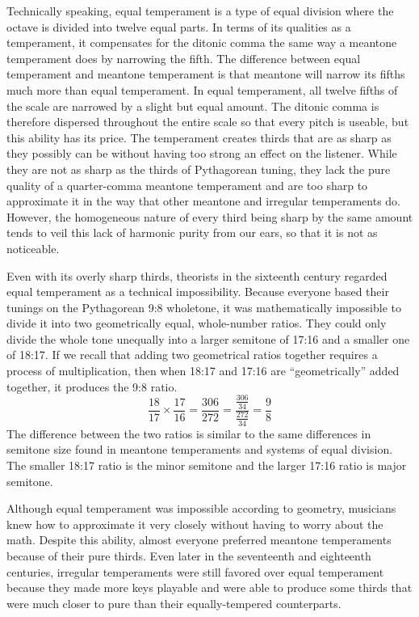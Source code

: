 Technically speaking, equal temperament is a type of equal division where the octave is
divided into twelve equal parts.  In terms of its qualities as a temperament, it
compensates for the ditonic comma the same way a meantone temperament does by narrowing
the fifth. The difference between equal temperament and meantone temperament is that
meantone will narrow its fifths much more than equal temperament.  In equal
temperament, all twelve fifths of the scale are narrowed by a slight but equal amount.
The ditonic comma is therefore dispersed throughout the entire scale so that every
pitch is useable, but this ability has its price.  The temperament creates thirds that
are as sharp as they possibly can be without having too strong an effect on the
listener.  While they are not as sharp as the thirds of Pythagorean tuning, they lack
the pure quality of a quarter-comma meantone temperament and are too sharp to
approximate it in the way that other meantone and irregular temperaments do. However,
the homogeneous nature of every third being sharp by the same amount tends to veil this
lack of harmonic purity from our ears, so that it is not as noticeable.

Even with its overly sharp thirds, theorists in the sixteenth century regarded equal
temperament as a technical impossibility. Because everyone based their tunings on the
Pythagorean 9:8 wholetone, it was mathematically impossible to divide it into two
geometrically equal, whole-number ratios. They could only divide the whole tone
unequally into a larger semitone of 17:16 and a smaller one of 18:17.
\autocite[20]{ML:1} If we recall that adding two geometrical ratios together requires a
process of multiplication, then when 18:17 and 17:16 are ``geometrically'' added
together, it produces the 9:8 ratio.
\begin{equation}
  \frac{18}{17} \times
  \frac{17}{16} =
  \frac{306}{272} =
  \frac{\frac{306}{34}}{\frac{272}{34}} =
  \frac{9}{8}
\end{equation}
The difference between the two ratios is similar to the same differences in semitone size
found in meantone temperaments and systems of equal division.  The smaller 18:17 ratio is
the minor semitone and the larger 17:16 ratio is major semitone.

Although equal temperament was impossible according to geometry, musicians knew
how to approximate it very closely without having to worry about the math.
Despite this ability, almost everyone preferred meantone temperaments because of
their pure thirds. Even later in the seventeenth and eighteenth centuries,
irregular temperaments were still favored over equal temperament because they
made more keys playable and were able to produce some thirds that were much
closer to pure than their equally-tempered counterparts.

